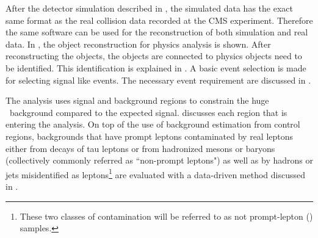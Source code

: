 After the detector simulation described in , the simulated data has the exact same format as the real collision data recorded at the CMS experiment. Therefore the same software can be used for the reconstruction of both simulation and real data. In , the object reconstruction for physics analysis is shown. After reconstructing the objects, the objects are connected to physics objects need to be identified. This identification is explained in . A basic event selection is made for selecting signal like events. The necessary event requirement are discussed in . 

The analysis uses signal and background regions to constrain the huge \SM\ background compared to the expected signal.  discusses each region that is entering the analysis. On top of the use of background estimation from control regions, backgrounds that have  prompt leptons  contaminated by real leptons either
from decays of tau leptons or from hadronized mesons or baryons
(collectively commonly referred as ``non-prompt leptons") as well as by
hadrons or jets misidentified as leptons\footnote{These two classes
of contamination will be referred to as not prompt-lepton (\NPL) samples.} are
evaluated with a data-driven method discussed in .

